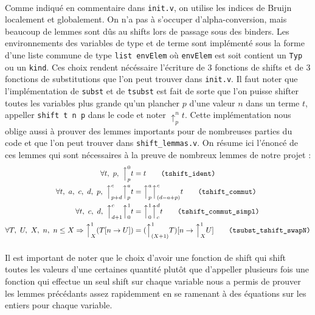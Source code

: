\documentclass[a4paper,10pt]{scrartcl}
\newcommand{\eqname}[1]{\tag*{#1}}
\begin{document}
     \paragraph{} Comme indiqué en commentaire dans \texttt{init.v}, on utilise les indices de Bruijn localement et globalement. On n'a pas à s'occuper d'alpha-conversion, mais beaucoup de lemmes sont dûs au shifts lors de passage sous des binders. Les environnements des variables de type et de terme sont implémenté sous la forme d'une liste commune de type \texttt{list envElem} où \texttt{envElem} est soit contient un \texttt{Typ} ou un \texttt{kind}. Ces choix rendent nécéssaire l'écriture de 3 fonctions de shifts et de 3 fonctions de substitutions que l'on peut trouver dans \texttt{init.v}. Il faut noter que l'implémentation de \texttt{subst} et de \texttt{tsubst} est fait de sorte que l'on puisse shifter toutes les variables plus grande qu'un plancher $p$ d'une valeur $n$ dans un terme $t$, appeller \texttt{shift t n p} dans le code et noter $\uparrow_p^nt$. Cette implémentation nous oblige aussi à prouver des lemmes importants pour de nombreuses parties du code et que l'on peut trouver dans \texttt{shift\_lemmas.v}. On résume ici l'énoncé de ces lemmes qui sont nécessaires à la preuve de nombreux lemmes de notre projet : 
     \begin{align} 
      \forall t,\ p,\ \Big\uparrow_p^0 t &= t \eqname{\texttt{(tshift\_ident)}} \\
      \forall t,\ a,\ c,\ d,\ p,\ \Big\uparrow_{p+d}^c \Big\uparrow_p^a t &= \Big\uparrow_{p}^a \Big\uparrow_{(d-a+p)}^c t \eqname{\texttt{(tshift\_commut)}} \\
      \forall t,\ c,\ d,\ \Big\uparrow_{d+1}^c \Big\uparrow_0^1 t &= \Big\uparrow_{0}^1 \Big\uparrow_{c}^d t \eqname{\texttt{(tshift\_commut\_simpl)}} \\
      \forall T,\ U,\ X,\ n,\ n \leq X \Rightarrow \Big\uparrow_{X}^1 (T[n\rightarrow U]) &= (\Big\uparrow_{(X+1)}^1T)[n \rightarrow \Big\uparrow_X^1U] \eqname{\texttt{(tsubst\_tshift\_swapN)}}
      \end{align}
      \paragraph{} Il est important de noter que le choix d'avoir une fonction de shift qui shift toutes les valeurs d'une certaines quantité plutôt que d'appeller plusieurs fois une fonction qui effectue un seul shift sur chaque variable nous a permis de prouver les lemmes précédants assez rapidemment en se ramenant à des équations sur les entiers pour chaque variable.
\end{document}
